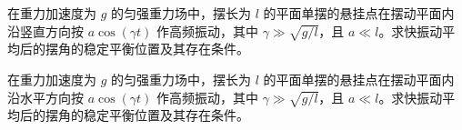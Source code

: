 \noindent\begin{minipage}{\textwidth}
在重力加速度为 $g$ 的匀强重力场中，摆长为 $l$ 的平面单摆的悬挂点在摆动平面内沿竖直方向按 $a\cos(\gamma t)$ 作高频振动，其中 $\gamma\gg\sqrt{g/l}$，且 $a\ll l$。求快振动平均后的摆角的稳定平衡位置及其存在条件。
\end{minipage}\par\vfill
\newpage
\noindent\begin{minipage}{\textwidth}
在重力加速度为 $g$ 的匀强重力场中，摆长为 $l$ 的平面单摆的悬挂点在摆动平面内沿水平方向按 $a\cos(\gamma t)$ 作高频振动，其中 $\gamma\gg\sqrt{g/l}$，且 $a\ll l$。求快振动平均后的摆角的稳定平衡位置及其存在条件。
\end{minipage}\par\vfill
